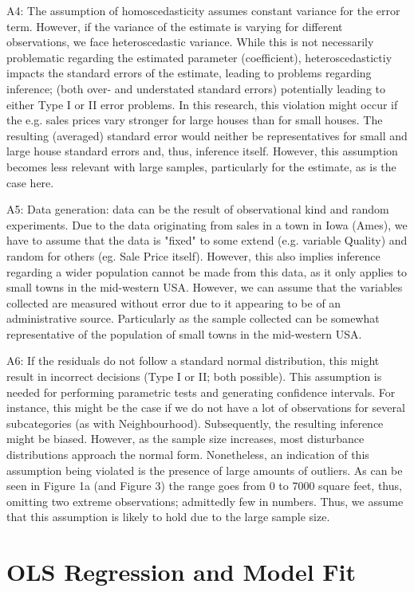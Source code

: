 \documentclass[a4paper]{article}
\begin{document}
A4: The assumption of homoscedasticity assumes constant variance for the error term. However, if the variance of the estimate is varying for different observations, we face heteroscedastic variance. While this is not necessarily problematic regarding the estimated parameter (coefficient), heteroscedastictiy impacts the standard errors of the estimate, leading to problems regarding inference; (both over- and understated standard errors) potentially leading to either Type I or II error problems. In this research, this violation might occur if the e.g. sales prices vary stronger for large houses than for small houses. The resulting (averaged) standard error would neither be representatives for small and large house standard errors and, thus, inference itself. However, this assumption becomes less relevant with large samples, particularly for the estimate, as is the case here.

A5: Data generation: data can be the result of observational kind and random experiments. Due to the data originating from sales in a town in Iowa (Ames), we have to assume that the data is "fixed" to some extend (e.g. variable Quality) and random for others (eg. Sale Price itself). However, this also implies inference regarding a wider population cannot be made from this data, as it only applies to small towns in the mid-western USA. However, we can assume that the  variables collected are measured without error due to it appearing to be of an administrative source. Particularly as the sample collected can be somewhat representative of the population of small towns in the mid-western USA. 

A6: If the residuals do not follow a standard normal distribution, this might result in incorrect decisions (Type I or II; both possible). This assumption is needed for performing parametric tests and generating confidence intervals. For instance, this might be the case if we do not have a lot of observations for several subcategories (as with Neighbourhood). Subsequently, the resulting inference might be biased. However, as the sample size increases, most disturbance distributions approach the normal form. 
 Nonetheless, an indication of this assumption being violated is the presence of large amounts of outliers. As can be seen in Figure 1a (and Figure 3) the range goes from 0 to 7000 square feet, thus, omitting two extreme observations; admittedly few in numbers. Thus, we assume that this assumption is likely to hold due to the large sample size.


\section{OLS Regression and Model Fit}
\end{document}
